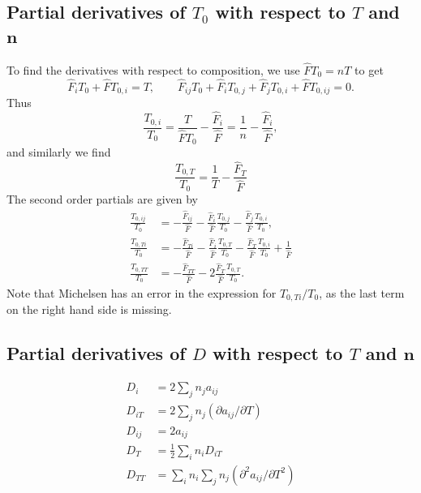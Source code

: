 \documentclass[english]{../thermomemo/thermomemo}
\newcommand{\mbn}[0]{\mathbf n}
\newcommand*{\hF}[0]{\hat F}
\newcommand{\lp}{\left(}
\newcommand{\rp}{\right)}
\numberwithin{equation}{section}
\begin{document}
\subsection*{Partial derivatives of $T_0$ with respect to $T$ and
  $\mbn$}
To find the derivatives with respect to composition, we use $\hF T_0 =
nT$ to get
$$
\hF_i T_0 + \hF T_{0,i} = T, \qquad \hF_{ij} T_0 + \hF_i T_{0,j} +
\hF_j T_{0,i} + \hF T_{0,ij} = 0.
$$
Thus
\begin{equation}
  \label{T_0i}
  \frac{T_{0,i}}{T_0} = \frac{T}{\hF T_0}- \frac{\hF_i}{\hF} = \frac1n - \frac{\hF_i}{\hF},
\end{equation}
and similarly we find
\begin{equation}
  \frac{T_{0,T}}{T_0} = \frac{1}{T} - \frac{\hF_T}{\hF}
\end{equation}
The second order partials are given by
\begin{align}
  \frac{T_{0,ij}}{T_0} &= -\frac{\hF_{ij}}{\hF} - \frac{\hF_i}{\hF} \frac{T_{0,j}}{T_0} - \frac{\hF_j}{\hF} \frac{T_{0,i}}{T_0}, \label{T_0ij} \\
  \frac{T_{0,Ti}}{T_0} &= -\frac{\hF_{Ti}}{\hF} - \frac{\hF_i}{\hF}
  \frac{T_{0,T}}{T_0} - \frac{\hF_T}{\hF} \frac{T_{0,i}}{T_0} + \frac{1}{\hF} \label{T_0Ti} \\
  \frac{T_{0,TT}}{T_0} &= -\frac{\hF_{TT}}{\hF} - 2\frac{\hF_T}{\hF}
  \frac{T_{0,T}}{T_0}. \label{T_0TT}
\end{align}
Note that Michelsen \cite{Michelsen07} has an error in the expression
for $T_{0,Ti}/T_0$, as the last term on the right hand side is missing.
\subsection*{Partial derivatives of $D$ with respect to $T$ and
  $\mbn$}
\begin{align}
  D_i   &= 2 \sum_j n_j a_{ij} \\
  D_{iT} &= 2 \sum_j n_j \lp \partial a_{ij}/\partial T \rp \\
  D_{ij} &= 2a_{ij} \\
  D_{T}  &= \tfrac12 \sum_i n_i D_{iT} \\
  D_{TT} &= \sum_i n_i \sum_j n_j \lp \partial^2 a_{ij}/\partial T^2
  \rp
\end{align}
\end{document}
